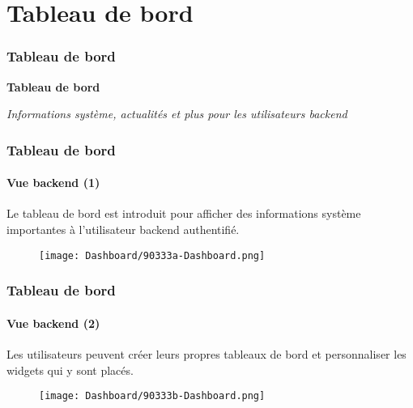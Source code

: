 %

\section{Tableau de bord}
\begin{frame}[fragile]
	\frametitle{Tableau de bord}

	\begin{center}\huge{\color{typo3darkgrey}\textbf{Tableau de bord}}\end{center}
	\begin{center}\large{\textit{Informations système, actualités et plus pour les utilisateurs backend}}\end{center}

\end{frame}


\begin{frame}[fragile]
	\frametitle{Tableau de bord}
	\framesubtitle{Vue backend (1)}

	Le tableau de bord est introduit pour afficher des informations système importantes à l'utilisateur backend authentifié.

	\begin{figure}
		\texttt{[image: Dashboard/90333a-Dashboard.png]}
	\end{figure}

\end{frame}


\begin{frame}[fragile]
	\frametitle{Tableau de bord}
	\framesubtitle{Vue backend (2)}

	Les utilisateurs peuvent créer leurs propres tableaux de bord et personnaliser les widgets qui
	y sont placés.

	\begin{figure}
		\texttt{[image: Dashboard/90333b-Dashboard.png]}
	\end{figure}

\end{frame}

